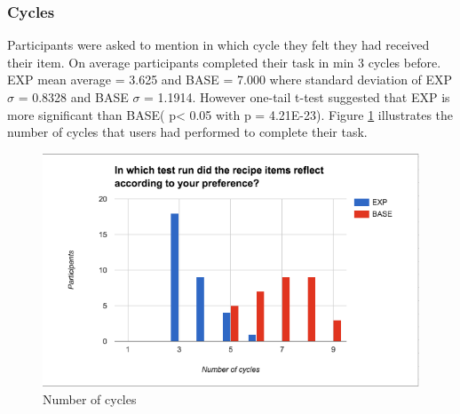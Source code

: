 \subsubsection{Cycles}
Participants were asked to mention in which cycle they felt they had received their item.  On average participants completed their task in min 3 cycles before.  EXP mean average = 3.625
 and BASE  = 7.000 where standard deviation of EXP ${\sigma}$ = 0.8328 and BASE ${\sigma}$ = 1.1914. However one-tail t-test suggested that EXP is more significant than BASE( p< 0.05 with p =  4.21E-23). Figure \ref{fig:ch5_stat_efficiency_cycles} illustrates the number of cycles that users had performed to complete their task. 
\begin{figure}[h]
	\centering
	\includegraphics[width= 1\linewidth]{figures/ch5_stat_efficiency_cycles}
	\caption{Number of cycles}
	\label{fig:ch5_stat_efficiency_cycles}
\end{figure}
\newpage
